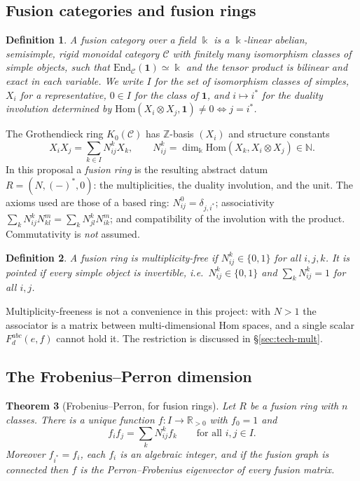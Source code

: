 \documentclass[11pt,a4paper]{article}
\newtheorem{theorem}{Theorem}[section]
\newtheorem{definition}[theorem]{Definition}
\theoremstyle{remark}
\newcommand{\C}{\mathcal{C}}
\newcommand{\one}{\mathbf{1}}
\newcommand{\field}{\Bbbk}
\newcommand{\R}{\mathbb{R}}
\newcommand{\Z}{\mathbb{Z}}
\newcommand{\N}{\mathbb{N}}
\begin{document}
\subsection{Fusion categories and fusion rings}

\begin{definition}
A \emph{fusion category} over a field $\field$ is a $\field$-linear abelian, semisimple, rigid monoidal
category $\C$ with finitely many isomorphism classes of simple objects, such that
$\mathrm{End}_\C(\one) \simeq \field$ and the tensor product is bilinear and exact in each variable.
We write $I$ for the set of isomorphism classes of simples, $X_i$ for a representative, $0 \in I$
for the class of $\one$, and $i \mapsto i^*$ for the duality involution determined by
$\mathrm{Hom}(X_i \otimes X_j, \one) \neq 0 \iff j = i^*$.
\end{definition}

The Grothendieck ring $K_0(\C)$ has $\Z$-basis $(X_i)$ and structure constants
\[
X_i X_j = \sum_{k \in I} N_{ij}^{k} X_k, \qquad N_{ij}^k = \dim_\field \mathrm{Hom}(X_k, X_i \otimes X_j) \in \N .
\]
In this proposal a \emph{fusion ring} is the resulting abstract datum
$R = (N, (-)^*, 0)$: the multiplicities, the duality involution, and the unit. The axioms used
are those of a based ring: $N_{ij}^0 = \delta_{j,i^*}$; associativity
$\sum_k N_{ij}^k N_{kl}^m = \sum_k N_{jl}^k N_{ik}^m$; and compatibility of the involution with
the product. Commutativity is \emph{not} assumed.

\begin{definition}
A fusion ring is \emph{multiplicity-free} if $N_{ij}^k \in \{0,1\}$ for all $i,j,k$. It is
\emph{pointed} if every simple object is invertible, i.e.\ $N_{ij}^k \in \{0,1\}$ and
$\sum_k N_{ij}^k = 1$ for all $i,j$.
\end{definition}

Multiplicity-freeness is not a convenience in this project: with $N > 1$ the associator is a
matrix between multi-dimensional Hom spaces, and a single scalar $F^{abc}_d(e,f)$ cannot hold
it. The restriction is discussed in \S\ref{sec:tech-mult}.

\subsection{The Frobenius--Perron dimension}

\begin{theorem}[Frobenius--Perron, for fusion rings]\label{thm:pf}
Let $R$ be a fusion ring with $n$ classes. There is a unique function $f \colon I \to \R_{>0}$
with $f_0 = 1$ and
\begin{equation}\label{eq:fpchar}
f_i f_j = \sum_{k} N_{ij}^{k} f_k \qquad \text{for all } i,j \in I .
\end{equation}
Moreover $f_{i^*} = f_i$, each $f_i$ is an algebraic integer, and if the fusion graph is
connected then $f$ is the Perron--Frobenius eigenvector of every fusion matrix.
\end{theorem}
\end{document}

